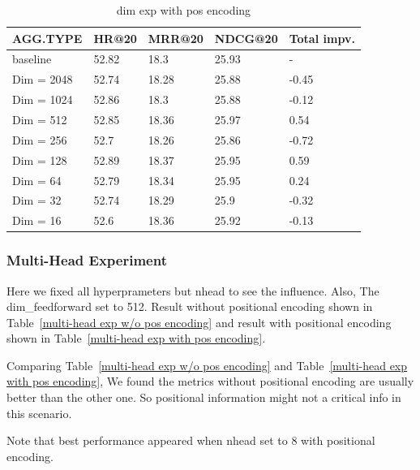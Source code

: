 \documentclass{article}
\begin{document}
\begin{table}
    \caption{dim exp with pos encoding}
    \label{dim exp with pos encoding}
    \centering
    \begin{tabular}{lllll}
        \toprule
        AGG.TYPE   & HR@20 & MRR@20 & NDCG@20 & Total impv. \\
        \midrule
        baseline   & 52.82 & 18.3   & 25.93   & -           \\
        Dim = 2048 & 52.74 & 18.28  & 25.88   & -0.45       \\
        Dim = 1024 & 52.86 & 18.3   & 25.88   & -0.12       \\
        Dim = 512  & 52.85 & 18.36  & 25.97   & 0.54        \\
        Dim = 256  & 52.7  & 18.26  & 25.86   & -0.72       \\
        Dim = 128  & 52.89 & 18.37  & 25.95   & 0.59        \\
        Dim = 64   & 52.79 & 18.34  & 25.95   & 0.24        \\
        Dim = 32   & 52.74 & 18.29  & 25.9    & -0.32       \\
        Dim = 16   & 52.6  & 18.36  & 25.92   & -0.13       \\
        \bottomrule
    \end{tabular}
\end{table}

\subsubsection{Multi-Head Experiment}

Here we fixed all hyperprameters but nhead to see the influence.
Also, The dim\_feedforward set to 512.
Result without positional encoding shown in
Table~\ref{multi-head exp w/o pos encoding} and result with
positional encoding shown in Table~\ref{multi-head exp with pos encoding}.

Comparing  Table~\ref{multi-head exp w/o pos encoding} and
Table~\ref{multi-head exp with pos encoding},
We found the metrics without positional encoding are usually
better than the other one.
So positional information might not a critical info in this scenario.

Note that best performance appeared when nhead set to 8 with positional encoding.
\end{document}
